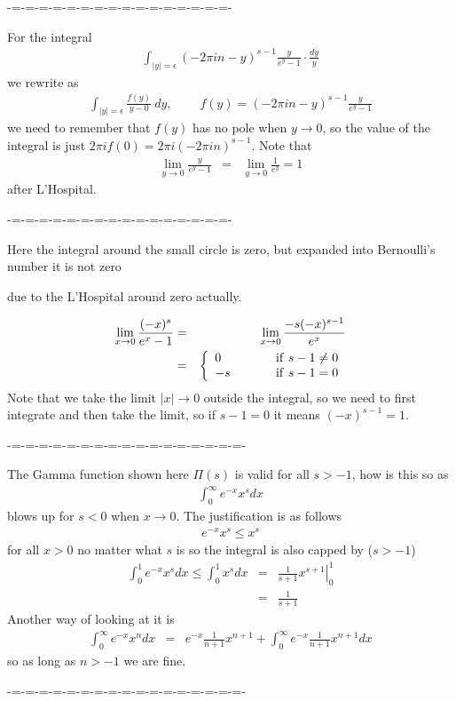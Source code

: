 \documentclass[aps,preprint,preprintnumbers,nofootinbib,showpacs,prd]{revtex4-1}
\newcommand{\nbea}{\begin{eqnarray*}}
\newcommand{\neea}{\end{eqnarray*}}
\begin{document}
-=-=-=-=-=-=-=-=-=-=-=-=-=-=-=-=-

For the integral
%
\nbea
\int_{|y|=\epsilon} (-2\pi i n - y)^{s-1} \frac{y}{e^y - 1} \cdot \frac{dy}{y}
\neea
%
we rewrite as
%
\nbea
\int_{|y|=\epsilon} \frac{f(y)}{y - 0} ~ dy, ~~~~~~~~~~ f(y) = (-2\pi i n - y)^{s-1} \frac{y}{e^y - 1}
\neea
%
we need to remember that $f(y)$ has no pole when $y\to 0$, so the value of the integral is just $2\pi i f(0) = 2\pi i(-2\pi i n)^{s-1}$. Note that
%
\nbea
\lim_{y\to0} \frac{y}{e^y - 1} & = & \lim_{y\to0} \frac{1}{e^y} = 1
\neea
%
after L'Hospital.



-=-=-=-=-=-=-=-=-=-=-=-=-=-=-=-=-

Here the integral around the small circle is zero, but expanded into Bernoulli's number it is not zero

due to the L'Hospital around zero actually.

%
\nbea
\lim_{x\to0} \frac{(-x)^s}{e^x - 1} & = & \lim_{x\to0} \frac{-s(-x)^{s-1}}{e^x} \\
& = & 
\left\{
\begin{array}{l c l}
0 & ~~~~~ &{\rm if~} s-1 \neq 0 \\
-s & ~~~~~ &{\rm if~} s-1 = 0
\end{array}
\right.
\neea
%
Note that we take the limit $|x|\to 0$ outside the integral, so we need to first integrate and then take the limit, so if $s-1=0$ it means $(-x)^{s-1} = 1$.

-=-=-=-=-=-=-=-=-=-=-=-=-=-=-=-=-=-

The Gamma function shown here $\Pi(s)$ is valid for all $s > -1$, how is this so as
%
\nbea
\int_0^\infty e^{-x} x^{s} dx
\neea
%
blows up for $s < 0$ when $x\to0$. The justification is as follows
%
\nbea
e^{-x} x^{s} \le x^s
\neea
%
for all $x > 0$ no matter what $s$ is so the integral is also capped by ($s > -1$)
%
\nbea
\int_0^1 e^{-x}x^s dx \le \int_0^1 x^s dx & = & \left.\frac{1}{s+1} x^{s+1} \right|_0^1 \\
& = & \frac{1}{s+1}
\neea
%
Another way of looking at it is
%
\nbea
\int_0^\infty e^{-x}x^n dx & = & e^{-x}\frac{1}{n+1}x^{n+1} + \int_0^\infty e^{-x}\frac{1}{n+1}x^{n+1} dx
\neea
%
so as long as $n>-1$ we are fine.

-=-=-=-=-=-=-=-=-=-=-=-=-=-=-=-=-=-
\end{document}
